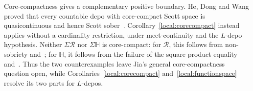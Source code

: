 \documentclass[10pt,a4paper]{article}
\theoremstyle{definition}
\newcommand{\HH}{\mathbb H}
\newcommand{\RR}{\mathcal R}
\begin{document}
Core-compactness gives a complementary positive boundary. He, Dong and Wang proved that every countable dcpo with core-compact Scott space is quasicontinuous and hence Scott sober~\cite[Theorem~3.3]{HDW}. Corollary~\ref{local:corecompact} instead applies without a cardinality restriction, under meet-continuity and the $L$-dcpo hypothesis. Neither $\Sigma\RR$ nor $\Sigma\HH$ is core-compact: for $\RR$, this follows from non-sobriety and~\cite[Theorem~3.3]{HDW}; for $\HH$, it follows from the failure of the square product equality and~\cite[Theorem~II-4.13]{GHK}. Thus the two counterexamples leave Jia's general core-compactness question open, while Corollaries~\ref{local:corecompact} and~\ref{local:functionspace} resolve its two parts for $L$-dcpos.








\end{document}
